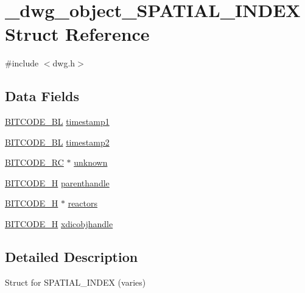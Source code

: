 \hypertarget{struct__dwg__object__SPATIAL__INDEX}{\section{\-\_\-dwg\-\_\-object\-\_\-\-S\-P\-A\-T\-I\-A\-L\-\_\-\-I\-N\-D\-E\-X \-Struct \-Reference}
\label{struct__dwg__object__SPATIAL__INDEX}
}


{\ttfamily \#include $<$dwg.\-h$>$}

\subsection*{\-Data \-Fields}
\begin{DoxyCompactItemize}
\item 
\hyperlink{dwg_8h_aebd5f127038868cbabc3d55d91da776c}{\-B\-I\-T\-C\-O\-D\-E\-\_\-\-B\-L} \hyperlink{struct__dwg__object__SPATIAL__INDEX_afaaa0d6c48b4d419d7c39569c98e45fb}{timestamp1}
\item 
\hyperlink{dwg_8h_aebd5f127038868cbabc3d55d91da776c}{\-B\-I\-T\-C\-O\-D\-E\-\_\-\-B\-L} \hyperlink{struct__dwg__object__SPATIAL__INDEX_a264c3417b94033ec1e2a2f9937c0c9d0}{timestamp2}
\item 
\hyperlink{dwg_8h_a7fd199a8f9c9cc52bdab220f65a2a619}{\-B\-I\-T\-C\-O\-D\-E\-\_\-\-R\-C} $\ast$ \hyperlink{struct__dwg__object__SPATIAL__INDEX_a392fbd6d6fc5b3b809855cfff6cd421a}{unknown}
\item 
\hyperlink{dwg_8h_a7c700e94e047a97ba8c24bdfe4029dc3}{\-B\-I\-T\-C\-O\-D\-E\-\_\-\-H} \hyperlink{struct__dwg__object__SPATIAL__INDEX_a721966b754bed8aab04fd4d246cde7e9}{parenthandle}
\item 
\hyperlink{dwg_8h_a7c700e94e047a97ba8c24bdfe4029dc3}{\-B\-I\-T\-C\-O\-D\-E\-\_\-\-H} $\ast$ \hyperlink{struct__dwg__object__SPATIAL__INDEX_a36ea363ef25b37c7c42d1d96d8e47979}{reactors}
\item 
\hyperlink{dwg_8h_a7c700e94e047a97ba8c24bdfe4029dc3}{\-B\-I\-T\-C\-O\-D\-E\-\_\-\-H} \hyperlink{struct__dwg__object__SPATIAL__INDEX_a916c3f31bc3f14f948c4d59c34cd0ccf}{xdicobjhandle}
\end{DoxyCompactItemize}


\subsection{\-Detailed \-Description}
\-Struct for \-S\-P\-A\-T\-I\-A\-L\-\_\-\-I\-N\-D\-E\-X (varies) 

